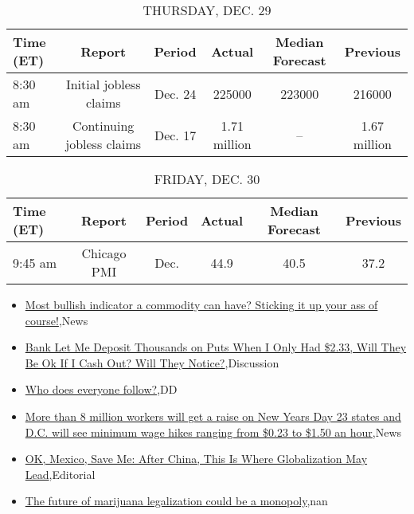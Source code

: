\documentclass{article}%
\begin{document}
%


\begin{table}[htbp]%
\caption{THURSDAY, DEC. 29}%
\centering%
\begin{adjustbox}{width=1\textwidth}%
\begin{tabular}{lccccc}
\toprule
Time (ET) &                    Report &  Period &       Actual & Median Forecast &     Previous \\
\midrule
  8:30 am &    Initial jobless claims & Dec. 24 &       225000 &          223000 &       216000 \\
  8:30 am & Continuing jobless claims & Dec. 17 & 1.71 million &              -- & 1.67 million \\
\bottomrule
\end{tabular}
%
\end{adjustbox}%
\end{table}

%


\begin{table}[htbp]%
\caption{FRIDAY, DEC. 30}%
\centering%
\begin{adjustbox}{width=1\textwidth}%
\begin{tabular}{lccccc}
\toprule
Time (ET) &      Report & Period & Actual & Median Forecast & Previous \\
\midrule
  9:45 am & Chicago PMI &   Dec. &   44.9 &            40.5 &     37.2 \\
\bottomrule
\end{tabular}
%
\end{adjustbox}%
\end{table}

%
\begin{itemize}%
\item%
\href{https://reddit.com/r/wallstreetbets/comments/101ahx6/most\_bullish\_indicator\_a\_commodity\_can\_have/}{Most bullish indicator a commodity can have? Sticking it up your ass of course!},News%
\item%
\href{https://reddit.com/r/wallstreetbets/comments/1017myj/bank\_let\_me\_deposit\_thousands\_on\_puts\_when\_i\_only/}{Bank Let Me Deposit Thousands on Puts When I Only Had \$2.33, Will They Be Ok If I Cash Out? Will They Notice?},Discussion%
\item%
\href{https://reddit.com/r/Baystreetbets/comments/zzv1nj/who\_does\_everyone\_follow/}{Who does everyone follow?},DD%
\item%
\href{https://reddit.com/r/Economics/comments/1019hza/more\_than\_8\_million\_workers\_will\_get\_a\_raise\_on/}{More than 8 million workers will get a raise on New Years Day  23 states and D.C. will see minimum wage hikes ranging from \$0.23 to \$1.50 an hour},News%
\item%
\href{https://reddit.com/r/Economics/comments/1016npk/ok\_mexico\_save\_me\_after\_china\_this\_is\_where/}{OK, Mexico, Save Me: After China, This Is Where Globalization May Lead},Editorial%
\item%
\href{https://reddit.com/r/Economics/comments/1015znm/the\_future\_of\_marijuana\_legalization\_could\_be\_a/}{The future of marijuana legalization could be a monopoly},nan%
\end{itemize}%
\end{document}
